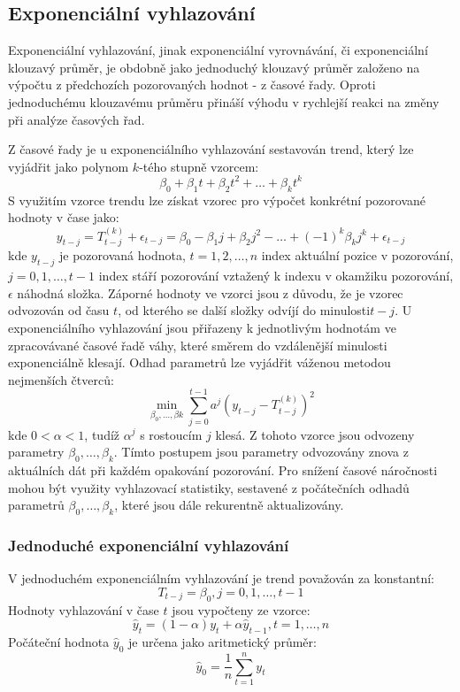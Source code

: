 \documentclass[thesis=M,czech]{FITthesis}[2012/06/26]
\begin{document}
\subsection{Exponenciální vyhlazování}
Exponenciální vyhlazování, jinak exponenciální vyrovnávání, či exponenciální klouzavý průměr, je obdobně jako jednoduchý klouzavý průměr založeno na výpočtu z předchozích pozorovaných hodnot - z časové řady. Oproti jednoduchému klouzavému průměru přináší výhodu v rychlejší reakci na změny při analýze časových řad.\cite{movingaverages}\par Z časové řady je u exponenciálního vyhlazování sestavován trend, který lze vyjádřit jako polynom $k$-tého stupně vzorcem:
\[ \beta_{0} + \beta_{1}t + \beta_{2}t^{2} + \dots + \beta_{k}t^{k} \]
S využitím vzorce trendu lze získat vzorec pro výpočet konkrétní pozorované hodnoty v čase jako:
\[ y_{t-j} = T^{(k)}_{t-j} + \epsilon_{t-j} = \beta_{0} - \beta_{1}j + \beta_{2}j^{2} - \dots + (-1)^{k}\beta_{k}j^{k} + \epsilon_{t-j} \]
kde\newline
$y_{t-j}$ je pozorovaná hodnota,\newline
$t = 1,2,\dots,n$ index aktuální pozice v pozorování,\newline
$j = 0,1,\dots,t-1$ index stáří pozorování vztažený k indexu v okamžiku pozorování,\newline
$\epsilon$ náhodná složka.\newline
Záporné hodnoty ve vzorci jsou z důvodu, že je vzorec odvozován od času $t$, od kterého se další složky odvíjí do minulosti$t-j$.
U exponenciálního vyhlazování jsou přiřazeny k jednotlivým hodnotám ve zpracovávané časové řadě váhy, které směrem do vzdálenější minulosti exponenciálně klesají. Odhad parametrů lze vyjádřit váženou metodou nejmenších čtverců:
\[ \min_{\beta_{0},\dots,\beta{k}}\sum_{j=0}^{t-1}a^{j}(y_{t-j} - T^{(k)}_{t-j})^{2} \]
kde $0 < \alpha < 1$, tudíž $\alpha^{j}$ s rostoucím $j$ klesá. Z tohoto vzorce jsou odvozeny parametry $\beta_{0},\dots,\beta_{k}$. Tímto postupem jsou parametry odvozovány znova z aktuálních dát při každém opakování pozorování. Pro snížení časové náročnosti mohou být využity vyhlazovací statistiky, sestavené z počátečních odhadů parametrů $\beta_{0},\dots,\beta_{k}$, které jsou dále rekurentně aktualizovány.
\subsubsection{Jednoduché exponenciální vyhlazování}
V jednoduchém exponenciálním vyhlazování je trend považován za konstantní:
\[ T_{t-j} = \beta_{0}, j=0,1,\dots,t-1 \]
Hodnoty vyhlazování v čase $t$ jsou vypočteny ze vzorce:
\[ \hat{y}_{t} = (1 - \alpha)y_{t} + \alpha\hat{y}_{t-1}, t = 1,\dots,n \]
Počáteční hodnota $\hat{y}_{0}$ je určena jako aritmetický průměr:
\[ \hat{y}_{0} = \frac{1}{n}\sum_{t = 1}^{n}y_{t} \]
\end{document}
